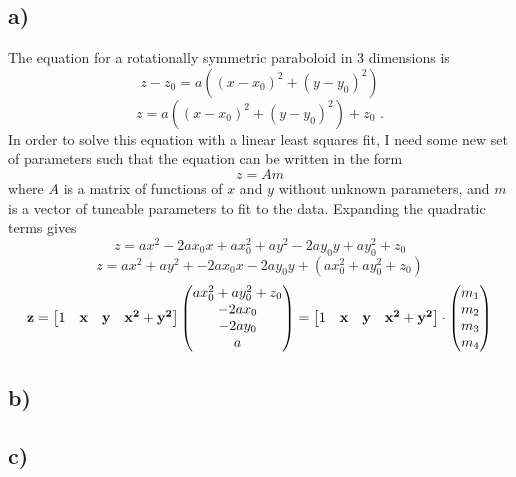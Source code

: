 \documentclass{article}
\newcommand{\<}[1]{\left\langle #1 \right\rangle }
\begin{document}
\subsection{a)}
The equation for a rotationally symmetric paraboloid in 3 dimensions is 
\[z-z_0 = a\left((x-x_0)^2 + (y-y_0)^2\right) \]
\[z = a\left((x-x_0)^2 + (y-y_0)^2\right) + z_0 \text{ .}\]
In order to solve this equation with a linear least squares fit, I need some new set of parameters such that the equation can be written in the form 
\[z = Am\] 
where $A$ is a matrix of functions of $x$ and $y$ without unknown parameters, and $m$ is a vector of tuneable parameters to fit to the data. Expanding the quadratic terms gives
\[z = ax^2 -2ax_0x + ax_0^2 + ay^2 -2ay_0y + ay_0^2 + z_0\]
\[z = ax^2 + ay^2 + -2ax_0x -2ay_0y + (ax_0^2 + ay_0^2 + z_0)\]
\[\vb{z} = 
\begin{bmatrix}
	1 & \vb{x} & \vb{y} & \vb{x^2} + \vb{y^2}
\end{bmatrix}
\begin{pmatrix}
	ax_0^2 + ay_0^2 + z_0\\
	-2ax_0\\
	-2ay_0\\
	a
\end{pmatrix}
 = 
\begin{bmatrix}
	1 & \vb{x} & \vb{y} & \vb{x^2} + \vb{y^2}
\end{bmatrix} \cdot 
\begin{pmatrix}
	m_1\\
	m_2\\
	m_3\\
	m_4\\
\end{pmatrix}
\]

\subsection{b)}


\subsection{c)}
\end{document}
